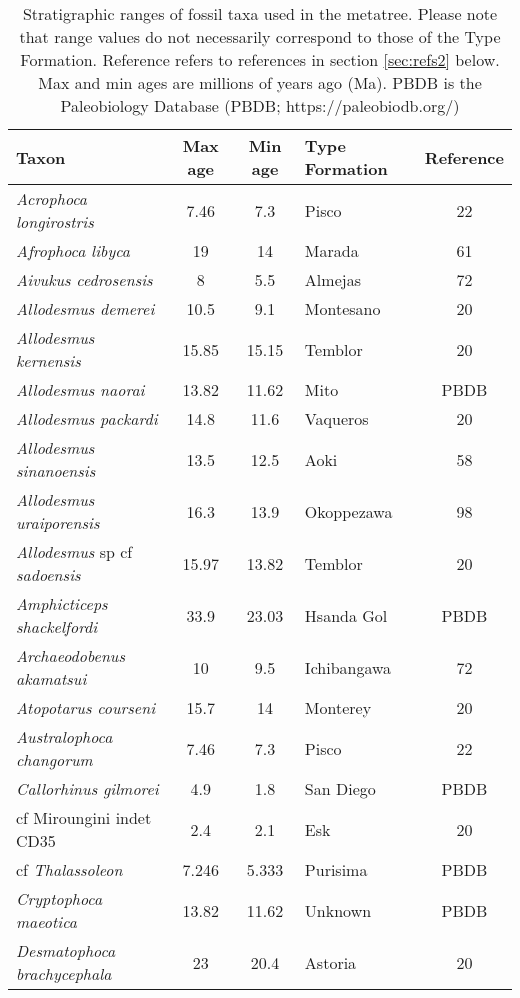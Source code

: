 \begin{longtable}{p{}cclc}

\caption{Stratigraphic ranges of fossil taxa used in the metatree. Please note that range values do not necessarily correspond to those of the Type Formation. Reference refers to references in section \ref{sec:refs2} below. Max and min ages are millions of years ago (Ma). PBDB is the Paleobiology Database (PBDB; https://paleobiodb.org/)}\\

\hline
\textbf{Taxon} & \textbf{Max age} & \textbf{Min age} & \textbf{Type Formation} & \textbf{Reference}\\
\hline
\textit{Acrophoca longirostris} & 	7.46	&	7.3	&	Pisco	&22\\
\textit{Afrophoca libyca} & 	19	&	14	&	Marada	& 61\\
\textit{Aivukus cedrosensis} & 	8	&	5.5	&	Almejas	&72\\
\textit{Allodesmus demerei} & 	10.5	&	9.1	&	Montesano	&20\\
\textit{Allodesmus kernensis} & 	15.85	&	15.15	&	Temblor	&20\\
\textit{Allodesmus naorai} & 	13.82	&	11.62	&	Mito	&PBDB\\
\textit{Allodesmus packardi} & 	14.8	&	11.6	&	Vaqueros	&20\\
\textit{Allodesmus sinanoensis} & 	13.5	&	12.5	&	Aoki	&58\\
\textit{Allodesmus uraiporensis} & 	16.3	&	13.9	&	Okoppezawa	&98\\
\textit{Allodesmus} sp cf \textit{sadoensis} & 	15.97	&	13.82	&	Temblor	&20\\
\textit{Amphicticeps shackelfordi} & 	33.9	&	23.03	&	Hsanda Gol	&PBDB\\
\textit{Archaeodobenus akamatsui} & 	10	&	9.5	&	Ichibangawa	&72\\
\textit{Atopotarus courseni} & 	15.7	&	14	&	Monterey	&20\\
\textit{Australophoca changorum} & 	7.46	&	7.3	&	Pisco	&22\\
\textit{Callorhinus gilmorei} & 	4.9	&	1.8	&	San Diego	&PBDB\\
cf Miroungini indet CD35 & 	2.4	&	2.1	&	Esk	&20\\
cf \textit{Thalassoleon} & 	7.246	&	5.333	&	Purisima	&PBDB\\
\textit{Cryptophoca maeotica} & 	13.82	&	11.62	&	Unknown	&PBDB\\
\textit{Desmatophoca brachycephala} & 	23	&	20.4	&	Astoria	&20\\

\end{longtable}
